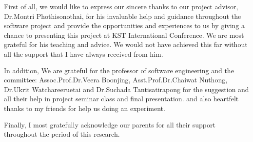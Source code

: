 \cleardoublepage


\begin{acknowledgements}

\hspace{1.5cm}First of all, we  would like to express our sincere thanks to our project advisor, Dr.Montri Phothisonothai, for his invaluable help and guidance throughout the software project and  provide the opportunities and experiences to us by giving a chance to presenting this project at KST International Conference. We are most grateful for his teaching and advice. We would not have achieved this far without all the support that I have always received from him.

\hspace{1.5cm}In addition, We are grateful for the professor of software engineering and the committee: 
Assoc.Prof.Dr.Veera Boonjing,
Asst.Prof.Dr.Chaiwat Nuthong,
Dr.Ukrit Watchareeruetai and 
Dr.Suchada Tantisatirapong
for the suggestion and all their help in project seminar class and final presentation. 
and also heartfelt thanks to my friends for help us doing an experiment.

\hspace{1.5cm}Finally, I most gratefully acknowledge our parents for all their support throughout the period of this research.

\end{acknowledgements}
